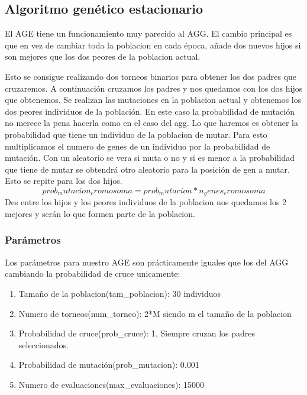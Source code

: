 \documentclass[titlepage]{article}
\begin{document}
	\subsection{Algoritmo genético estacionario}
	El AGE tiene un funcionamiento muy parecido al AGG. El cambio principal es que en vez de cambiar toda la poblacion en cada época, añade dos nuevos hijos si son mejores que los dos peores de la poblacion actual.
	
	Esto se consigue realizando dos torneos binarios para obtener los dos padres que cruzaremos. A continuación cruzamos los padres y nos quedamos con los dos hijos que obtenemos. Se realizan las mutaciones en la poblacion actual y obtenemos los dos peores individuos de la población. En este caso la probabilidad de mutación no merece la pena hacerla como en el caso del agg. Lo que haremos es obtener la probabilidad que tiene un individuo de la poblacion de mutar. Para esto multiplicamos el numero de genes de un individuo por la probabilidad de mutación. Con un aleatorio se vera si muta o no y si es menor a la probabilidad que tiene de mutar se obtendrá otro aleatorio para la posición de gen a mutar. Esto se repite para los dos hijos.
	$$
	prob_mutacion_cromosoma = prob_mutacion * n_genes_cromosoma
	$$
	Des entre los hijos y los peores individuos de la poblacion nos quedamos los 2 mejores y serán lo que formen parte de la poblacion.
	\subsubsection{Parámetros}
	Los parámetros para nuestro AGE son prácticamente iguales que los del AGG cambiando la probabilidad de cruce unicamente:
	\begin{enumerate}
		\item Tamaño de la poblacion(tam\_poblacion): 30 individuos
		\item Numero de torneos(num\_torneo): 2*M siendo m el tamaño de la poblacion
		\item Probabilidad de cruce(prob\_cruce): 1. Siempre cruzan los padres seleccionados.
		\item Probabilidad de mutación(prob\_mutacion): 0.001
		\item Numero de evaluaciones(max\_evaluaciones): 15000
	\end{enumerate}
	\newpage
\end{document}
